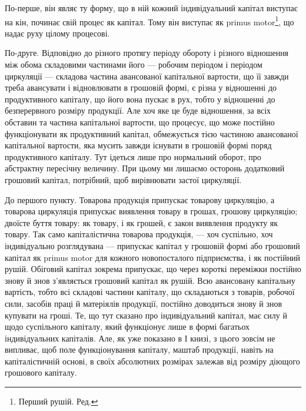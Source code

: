 По-перше, він являє ту форму, що в ній кожний індивідуальний капітал
виступає на кін, починає свій процес як капітал. Тому він виступає
як primus motor\footnote*{
Перший рушій. Ред.
}, що надає руху цілому процесові.

По-друге. Відповідно до різного протягу періоду обороту і різного
відношення між обома складовими частинами його — робочим періодом і
періодом циркуляції — складова частина авансованої капітальної вартости,
що її завжди треба авансувати і відновлювати в грошовій формі, є різна
у відношенні до продуктивного капіталу, що його вона пускає в рух,
тобто у відношенні до безперервного розміру продукції. Але хоч яке
це буде відношення, за всіх обставин та частина капітальної вартости,
що процесує, що може постійно функціонувати як продуктивний капітал,
обмежується тією частиною авансованої капітальної вартости, яка мусить
завжди існувати в грошовій формі поряд продуктивного капіталу. Тут
ідеться лише про нормальний оборот, про абстрактну пересічну величину.
При цьому ми лишаємо осторонь додатковий грошовий капітал,
потрібний, щоб вирівнювати застої циркуляції.

До першого пункту. Товарова продукція припускає товарову
циркуляцію, а товарова циркуляція припускає виявлення товару в грошах,
грошову циркуляцію; двоїсте буття товару: як товару, і як грошей,
є закон виявлення продукту як товару. Так само капіталістична товарова
продукція, — хоч суспільно, хоч індивідуально розглядувана —
припускає капітал у грошовій формі або грошовий капітал як primus
motor для кожного новопосталого підприємства, і як постійний рушій. Обіговий
капітал зокрема припускає, що через короткі переміжки постійно
знову й знов з’являється грошовий капітал як рушій. Всю авансовану
капітальну вартість, тобто всі складові частини капіталу, що складаються
з товарів, робочої сили, засобів праці й матеріялів продукції, постійно
доводиться знову й знов купувати на гроші. Те, що тут сказано про індивідуальний
капітал, має силу й щодо суспільного капіталу, який функціонує
лише в формі багатьох індивідуальних капіталів. Але, як уже показано
в І книзі, з цього зовсім не випливає, щоб поле функціонування
капіталу, маштаб продукції, навіть на капіталістичній основі, в своїх
абсолютних розмірах залежав від розміру діющого грошового капіталу.

